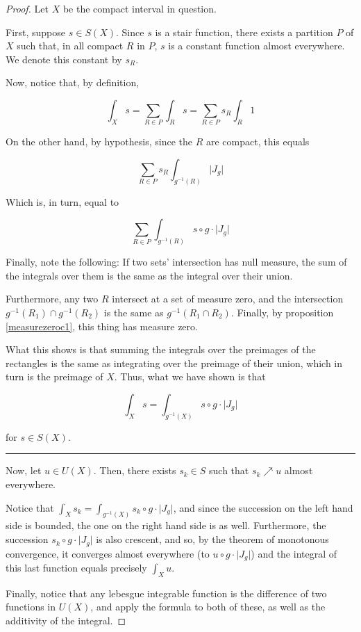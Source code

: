 \documentclass[11pt]{article}
\theoremstyle{definition}
\theoremstyle{plain}
\newcommand{\mo}{^{-1}}
\begin{document}
\begin{proof}
Let $X$ be the compact interval in question.

First, suppose $s \in S(X)$. Since $s$ is a stair function, there exists a partition $P$ of $X$ such that, in all compact $R$ in $P$, $s$ is a constant function almost everywhere. We denote this constant by $s_R$.

Now, notice that, by definition,

\[\int_X s = \sum_{R \in P} \int_R s = \sum_{R \in P} s_R \int_R 1 \]

On the other hand, by hypothesis, since the $R$ are compact, this equals

\[\sum_{R \in P} s_R \int_{g\mo(R)} \lvert J_g \rvert \]

Which is, in turn, equal to

\[\sum_{R \in P} \int_{g\mo(R)} s \circ g \cdot \lvert J_g \rvert \]

Finally, note the following: If two sets' intersection has null measure, the sum of the integrals over them is the same as the integral over their union.

Furthermore, any two $R$ intersect at a set of measure zero, and the intersection  $g\mo(R_1) \cap g\mo(R_2)$ is the same as $g\mo(R_1 \cap R_2)$. Finally, by proposition \ref{measurezeroc1}, this thing has measure zero.

What this shows is that summing the integrals over the preimages of the rectangles is the same as integrating over the preimage of their union, which in turn is the preimage of $X$. Thus, what we have shown is that

\[\int_X s = \int_{g\mo(X)} s \circ g \cdot \lvert J_g \rvert\]

for $s \in S(X)$.

\noindent\rule{\textwidth}{1pt}

Now, let $u \in U(X)$. Then, there exists $s_k \in S$ such that $s_k \nearrow u$ almost everywhere.

Notice that $\int_X s_k = \int_{g\mo(X)} s_k \circ g \cdot \lvert J_g \rvert$, and since the succession on the left hand side is bounded, the one on the right hand side is as well. Furthermore, the succession $s_k \circ g \cdot \lvert J_g \rvert$ is also crescent, and so, by the theorem of monotonous convergence, it converges almost everywhere (to $u \circ g \cdot \lvert J_g \rvert$) and the integral of this last function equals precisely $\int_X u$.

Finally, notice that any lebesgue integrable function is the difference of two functions in $U(X)$, and apply the formula to both of these, as well as the additivity of the integral.

\end{proof}
\end{document}
